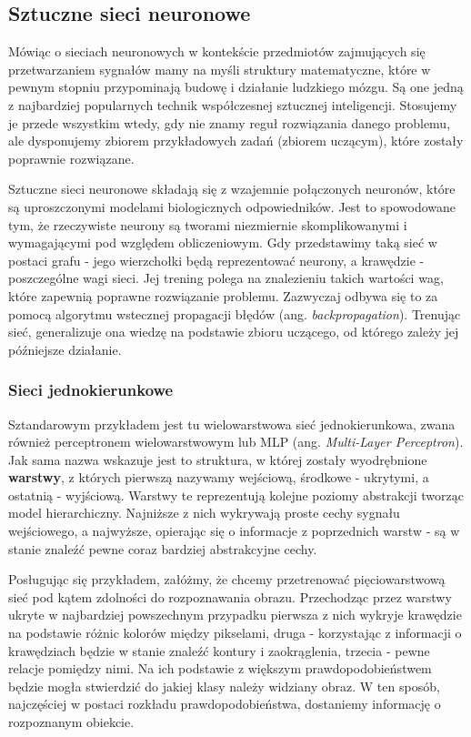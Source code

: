 \documentclass{article}
\begin{document}
\subsection*{\LARGE{Sztuczne sieci neuronowe}} 

Mówiąc o sieciach neuronowych w kontekście przedmiotów zajmujących się przetwarzaniem sygnałów mamy na myśli struktury matematyczne, które w pewnym stopniu przypominają budowę i działanie ludzkiego mózgu. Są one jedną z najbardziej popularnych technik współczesnej sztucznej inteligencji. Stosujemy je przede wszystkim wtedy, gdy nie znamy reguł rozwiązania danego problemu, ale dysponujemy zbiorem przykładowych zadań (zbiorem uczącym), które zostały poprawnie rozwiązane. 

Sztuczne sieci neuronowe składają się z wzajemnie połączonych neuronów, które są uproszczonymi modelami biologicznych odpowiedników. Jest to spowodowane tym, że rzeczywiste neurony są tworami niezmiernie skomplikowanymi i wymagającymi pod względem obliczeniowym. Gdy przedstawimy taką sieć w postaci grafu - jego wierzchołki będą reprezentować neurony, a krawędzie - poszczególne wagi sieci. Jej trening polega na znalezieniu takich wartości wag, które zapewnią poprawne rozwiązanie problemu. Zazwyczaj odbywa się to za pomocą algorytmu wstecznej propagacji błędów (ang. \emph{backpropagation}). Trenując sieć, generalizuje ona wiedzę na podstawie zbioru uczącego, od którego zależy jej późniejsze działanie.

\subsubsection*{\Large{Sieci jednokierunkowe}}
Sztandarowym przykładem jest tu wielowarstwowa sieć jednokierunkowa, zwana również perceptronem wielowarstwowym lub MLP (ang. \emph{Multi-Layer Perceptron}). Jak sama nazwa wskazuje jest to struktura, w której zostały wyodrębnione \textbf{warstwy}, z których pierwszą nazywamy wejściową, środkowe - ukrytymi, a ostatnią - wyjściową. Warstwy te reprezentują kolejne poziomy abstrakcji tworząc model hierarchiczny. Najniższe z nich wykrywają proste cechy sygnału wejściowego, a najwyższe, opierając się o informacje z poprzednich warstw - są w stanie znaleźć pewne coraz bardziej abstrakcyjne cechy. 

Posługując się przykładem, załóżmy, że chcemy przetrenować pięciowarstwową sieć pod kątem zdolności do rozpoznawania obrazu. Przechodząc przez warstwy ukryte w najbardziej powszechnym przypadku pierwsza z nich wykryje krawędzie na podstawie różnic kolorów między pikselami, druga - korzystając z informacji o krawędziach będzie w stanie znaleźć kontury i zaokrąglenia, trzecia - pewne relacje pomiędzy nimi. Na ich podstawie z większym prawdopodobieństwem będzie mogła stwierdzić do jakiej klasy należy widziany obraz. W ten sposób, najczęściej w postaci rozkładu prawdopodobieństwa, dostaniemy informację o rozpoznanym obiekcie.
\end{document}
